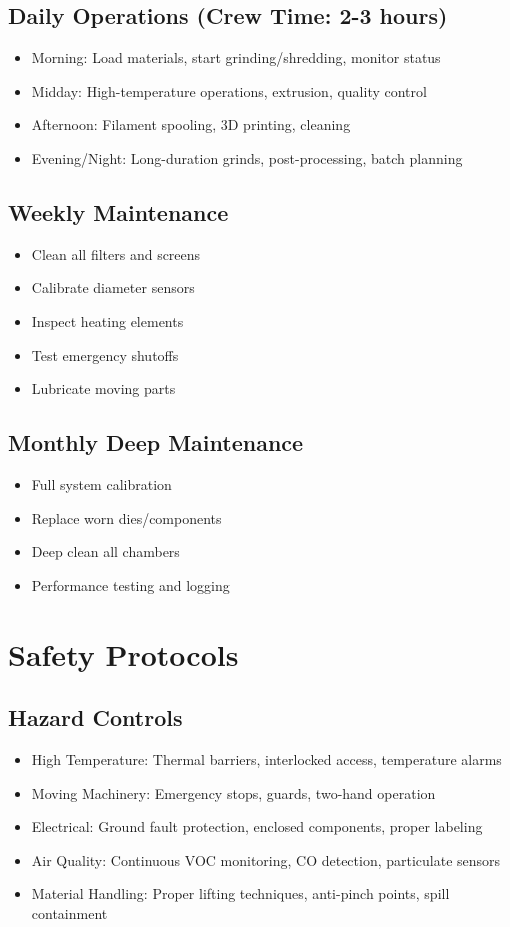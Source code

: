 \documentclass[12pt, a4paper]{article}
\begin{document}
\subsection{Daily Operations (Crew Time: 2-3 hours)}
\begin{itemize}
    \item Morning: Load materials, start grinding/shredding, monitor status
    \item Midday: High-temperature operations, extrusion, quality control
    \item Afternoon: Filament spooling, 3D printing, cleaning
    \item Evening/Night: Long-duration grinds, post-processing, batch planning
\end{itemize}

\subsection{Weekly Maintenance}
\begin{itemize}
    \item Clean all filters and screens
    \item Calibrate diameter sensors
    \item Inspect heating elements
    \item Test emergency shutoffs
    \item Lubricate moving parts
\end{itemize}

\subsection{Monthly Deep Maintenance}
\begin{itemize}
    \item Full system calibration
    \item Replace worn dies/components
    \item Deep clean all chambers
    \item Performance testing and logging
\end{itemize}

\section{Safety Protocols}

\subsection{Hazard Controls}
\begin{itemize}
    \item High Temperature: Thermal barriers, interlocked access, temperature alarms
    \item Moving Machinery: Emergency stops, guards, two-hand operation
    \item Electrical: Ground fault protection, enclosed components, proper labeling
    \item Air Quality: Continuous VOC monitoring, CO detection, particulate sensors
    \item Material Handling: Proper lifting techniques, anti-pinch points, spill containment
\end{itemize}
\end{document}
